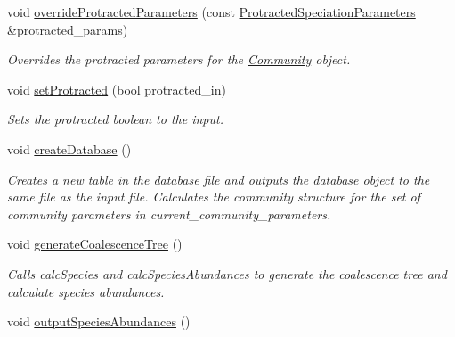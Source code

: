 \begin{DoxyCompactItemize}
void \hyperlink{class_community_a9fa7f842fc8b5bcd15d48010b1a58178}{override\+Protracted\+Parameters} (const \hyperlink{struct_protracted_speciation_parameters}{Protracted\+Speciation\+Parameters} \&protracted\+\_\+params)
\begin{DoxyCompactList}\small\item\em Overrides the protracted parameters for the \hyperlink{class_community}{Community} object. \end{DoxyCompactList}\item 
void \hyperlink{class_community_a649afbf07398a1717ad49cb22bb744ff}{set\+Protracted} (bool protracted\+\_\+in)
\begin{DoxyCompactList}\small\item\em Sets the protracted boolean to the input. \end{DoxyCompactList}\item 
void \hyperlink{class_community_ad6e92dafaf00fd65cc29ca436dc61a2e}{create\+Database} ()
\begin{DoxyCompactList}\small\item\em Creates a new table in the database file and outputs the database object to the same file as the input file. Calculates the community structure for the set of community parameters in current\+\_\+community\+\_\+parameters. \end{DoxyCompactList}\item 
void \hyperlink{class_community_a078a9a1210d6b7e8f6f378891f7e8b86}{generate\+Coalescence\+Tree} ()\hypertarget{class_community_a078a9a1210d6b7e8f6f378891f7e8b86}{}\label{class_community_a078a9a1210d6b7e8f6f378891f7e8b86}

\begin{DoxyCompactList}\small\item\em Calls calc\+Species and calc\+Species\+Abundances to generate the coalescence tree and calculate species abundances. \end{DoxyCompactList}\item 
void \hyperlink{class_community_a8cb8044c6b2e290e7933cbc78d7019be}{output\+Species\+Abundances} ()\hypertarget{class_community_a8cb8044c6b2e290e7933cbc78d7019be}{}\label{class_community_a8cb8044c6b2e290e7933cbc78d7019be}


\end{DoxyCompactItemize}
